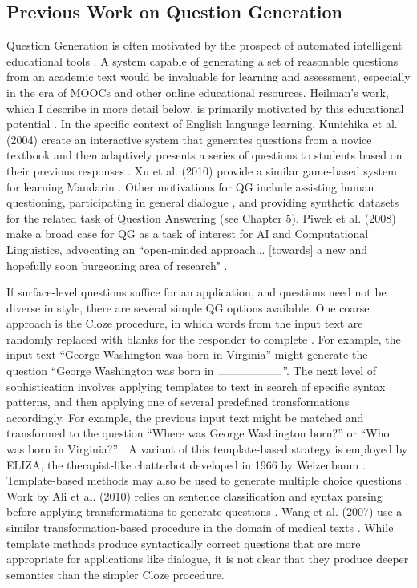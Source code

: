 \subsection{Previous Work on Question Generation}

Question Generation is often motivated by the prospect of automated intelligent educational tools \cite{graesser2005scaffolding, heilman2011automatic}. A system capable of generating a set of reasonable questions from an academic text would be invaluable for learning and assessment, especially in the era of MOOCs and other online educational resources. Heilman's work, which I describe in more detail below, is primarily motivated by this educational potential \cite{heilman2011automatic}. In the specific context of English language learning, Kunichika et al. (2004) create an interactive system that generates questions from a novice textbook and then adaptively presents a series of questions to students based on their previous responses \cite{kunichika2004automated}. Xu et al. (2010) provide a similar game-based system for learning Mandarin \cite{xu2009automatic}. Other motivations for QG include assisting human questioning, participating in general dialogue \cite{walker2001spot}, and providing synthetic datasets for the related task of Question Answering (see Chapter 5). Piwek et al. (2008) make a broad case for QG as a task of interest for AI and Computational Linguistics, advocating an ``open-minded approach... [towards] a new and hopefully soon burgeoning area of research" \cite{piwek2008generating}.

If surface-level questions suffice for an application, and questions need not be diverse in style, there are several simple QG options available. One coarse approach is the Cloze procedure, in which words from the input text are randomly replaced with blanks for the responder to complete \cite{taylor1953cloze}. For example, the input text ``George Washington was born in Virginia'' might generate the question ``George Washington was born in $\rule{2cm}{0.05mm}$''. The next level of sophistication involves applying templates to text in search of specific syntax patterns, and then applying one of several predefined transformations accordingly. For example, the previous input text might be matched and transformed to the question ``Where was George Washington born?'' or ``Who was born in Virginia?'' \cite{gates2008automatically, kunichika2004automated, heilman2011automatic}. A variant of this template-based strategy is employed by ELIZA, the therapist-like chatterbot developed in 1966 by Weizenbaum \cite{weizenbaum1966eliza}. Template-based methods may also be used to generate multiple choice questions \cite{mitkov2006computer}. Work by Ali et al. (2010) relies on sentence classification and syntax parsing before applying transformations to generate questions \cite{ali2010automatic}.  Wang et al. (2007) use a similar transformation-based procedure in the domain of medical texts \cite{wang2007automatic}. While template methods produce syntactically correct questions that are more appropriate for applications like dialogue, it is not clear that they produce deeper semantics than the simpler Cloze procedure. 

